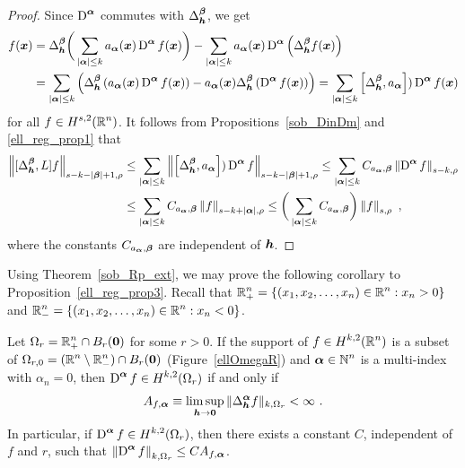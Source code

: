 \begin{proof}
Since $\displaystyle \operatorname{D}^{{\bm{\alpha}}}$ commutes with
$\displaystyle \Delta_{{\bm{h}}}^{{\bm{\beta}}}$, we get
\begin{align*}
[\Delta^{\VEC{\beta}}_{\VEC{h}}, L] f(\VEC{x}) &=
\Delta^{\VEC{\beta}}_{\VEC{h}}\bigg(\sum_{|\VEC{\alpha}|\leq k}
a_{\VEC{\alpha}}(\VEC{x}) \diff^{\VEC{\alpha}} f(\VEC{x}) \bigg) -
\sum_{|\VEC{\alpha}|\leq k} a_{\VEC{\alpha}}(\VEC{x}) \diff^{\VEC{\alpha}}
\left(\Delta^{\VEC{\beta}}_{\VEC{h}} f(\VEC{x}) \right) \\
&= \sum_{|\VEC{\alpha}|\leq k} \left( \Delta^{\VEC{\beta}}_{\VEC{h}}
\left( a_{\VEC{\alpha}}(\VEC{x}) \diff^{\VEC{\alpha}} f(\VEC{x}) \right)
- a_{\VEC{\alpha}}(\VEC{x}) \Delta^{\VEC{\beta}}_{\VEC{h}}
\left( \diff^{\VEC{\alpha}} f(\VEC{x}) \right) \right)
= \sum_{|\VEC{\alpha}|\leq k} \left[ \Delta^{\VEC{\beta}}_{\VEC{h}},
a_{\VEC{\alpha}} \right]) \diff^{\VEC{\alpha}} f(\VEC{x})
\end{align*}
for all $\displaystyle f \in H^{s,2}(\mathbb{R}^n)$.  It follows from
Propositions~\ref{sob_DinDm} and \ref{ell_reg_prop1} that
\begin{align*}
\left\| [\Delta^{{\bm{\beta}}}_{{\bm{h}}}, L] f \right\|_{s-k-|{\bm{\beta}}|+1,\rho}
&\leq \sum_{|{\bm{\alpha}}|\leq k} \left\|\left[ \Delta^{{\bm{\beta}}}_{{\bm{h}}},
a_{{\bm{\alpha}}} \right])
\operatorname{D}^{{\bm{\alpha}}} f \right\|_{s-k-|{\bm{\beta}}|+1,\rho}
\leq \sum_{|{\bm{\alpha}}|\leq k} C_{a_{{\bm{\alpha}}},{\bm{\beta}}}
\left\| \operatorname{D}^{{\bm{\alpha}}} f \right\|_{s-k,\rho} \\
&\leq \sum_{|{\bm{\alpha}}|\leq k} C_{a_{{\bm{\alpha}}},{\bm{\beta}}}
\left\| f \right\|_{s-k+|{\bm{\alpha}}|,\rho}
\leq \bigg( \sum_{|{\bm{\alpha}}|\leq k} C_{a_{{\bm{\alpha}}},{\bm{\beta}}}\bigg)
\left\| f \right\|_{s,\rho} \ ,
\end{align*}
where the constants $C_{a_{\bm{\alpha}},{\bm{\beta}}}$ are independent
of ${\bm{h}}$.
\end{proof}

Using Theorem~\ref{sob_Rp_ext}, we may prove the following corollary
to Proposition~\ref{ell_reg_prop3}.  Recall that
$\displaystyle \mathbb{R}^n_+ = \{ (x_1,x_2,\ldots,x_n) \in \mathbb{R}^n : x_n>0 \}$
and $\displaystyle \mathbb{R}^n_- = \{ (x_1,x_2,\ldots,x_n) \in \mathbb{R}^n : x_n<0 \}$.

\begin{cor} \label{ell_reg_cor3}
Let $\displaystyle \Omega_r = \mathbb{R}^n_+ \cap B_r({\bm{0}})$ for some $r>0$.
If the support of $\displaystyle f\in H^{k,2}(\mathbb{R}^n)$ is a subset of
$\displaystyle \Omega_{r,0} = (\mathbb{R}^n \setminus \mathbb{R}^n_-) \cap
B_r({\bm{0}})$ (Figure~\ref{ellOmegaR}) and
$\displaystyle {\bm{\alpha}} \in \mathbb{N}^n$ is a multi-index with $\alpha_n=0$, then
$\displaystyle \operatorname{D}^{{\bm{\alpha}}} f \in H^{k,2}(\Omega_r)$ if and only if
\[
A_{f,\VEC{\alpha}} \equiv \limsup_{\VEC{h}\rightarrow \VEC{0}}
\|\Delta^{\VEC{\alpha}}_{\VEC{h}} f\|_{k,\Omega_r} < \infty \ .
\]
In particular, if $\displaystyle \operatorname{D}^{{\bm{\alpha}}} f \in H^{k,2}(\Omega_r)$,
then there exists a constant $C$, independent of $f$ and $r$, such that 
$\displaystyle \left\| \operatorname{D}^{{\bm{\alpha}}} f \right\|_{k,\Omega_r} \leq
C A_{f,{\bm{\alpha}}}$.
\end{cor}

